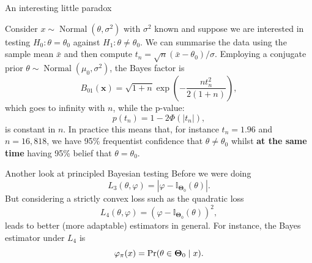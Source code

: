 \begin{frame}{An interesting little paradox}
\begin{idea}
Consider $x \sim \operatorname{Normal}(\theta, \sigma^2)$ with $\sigma^2$ known and suppose we are interested in testing $H_0: \theta = \theta_0$ against $H_1: \theta \neq \theta_0$.
We can summarise the data using the sample mean $\bar{x}$ and then compute $t_n = \sqrt{n}(\bar{x}-\theta_0)/\sigma$. 
Employing a conjugate prior $\theta \sim \operatorname{Normal}(\mu_0, \sigma^2)$,
the Bayes factor is
\begin{equation*}
B_{01}(\boldsymbol{x}) = \sqrt{1 + n}\exp\left(-\frac{nt_n^2}{2(1+n)}\right),
\end{equation*}
which goes to infinity with $n$, while the p-value:
\begin{equation*}
 p(t_n) = 1-2\Phi(|t_n|),
\end{equation*}
is constant in $n$.
In practice this means that, for instance $t_n = 1.96$ and $n = 16, 818$, we have 95\% frequentist confidence that $\theta \neq \theta_0$ whilst \textbf{at the same time} having 95\% belief that $\theta = \theta_0$.
\end{idea} 
\end{frame}
\begin{frame}{Another look at principled Bayesian testing}
 Before we were doing
 \begin{equation*}
  L_3(\theta, \varphi) = |\varphi - \mathbb{I}_{\boldsymbol{\Theta}_0}(\theta)|.
 \end{equation*}
But considering a strictly convex loss such as the quadratic loss 
 \begin{equation*}
  L_4(\theta, \varphi) = \left(\varphi - \mathbb{I}_{\boldsymbol{\Theta}_0}(\theta)\right)^2,
 \end{equation*}
 leads to better (more adaptable) estimators in general.
 For instance, the Bayes estimator under $L_4$ is
 \begin{equation*}
  \varphi_\pi(x) = \operatorname{Pr}(\theta \in  \boldsymbol{\Theta}_0 \mid x).
 \end{equation*}
 \end{frame}
